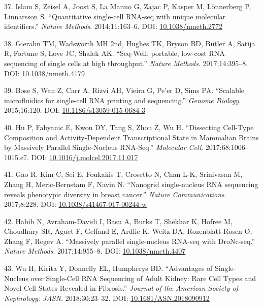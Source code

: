 \documentclass[11pt,a4paper,titlepage,twoside,openright]{style/unimelbthesis}
\theoremstyle{definition}
\theoremstyle{definition}
\theoremstyle{definition}
\theoremstyle{remark}
\begin{document}
\begin{mainmatter}
\leavevmode\hypertarget{ref-Islam2014-gq}{}%
37. Islam S, Zeisel A, Joost S, La Manno G, Zajac P, Kasper M, Lönnerberg P, Linnarsson S. ``Quantitative single-cell RNA-seq with unique molecular identifiers.'' \emph{Nature Methods}. 2014;11:163--6. DOI: \href{https://doi.org/10.1038/nmeth.2772}{10.1038/nmeth.2772}

\leavevmode\hypertarget{ref-Gierahn2017-kr}{}%
38. Gierahn TM, Wadsworth MH 2nd, Hughes TK, Bryson BD, Butler A, Satija R, Fortune S, Love JC, Shalek AK. ``Seq-Well: portable, low-cost RNA sequencing of single cells at high throughput.'' \emph{Nature Methods}. 2017;14:395--8. DOI: \href{https://doi.org/10.1038/nmeth.4179}{10.1038/nmeth.4179}

\leavevmode\hypertarget{ref-Bose2015-vn}{}%
39. Bose S, Wan Z, Carr A, Rizvi AH, Vieira G, Pe'er D, Sims PA. ``Scalable microfluidics for single-cell RNA printing and sequencing.'' \emph{Genome Biology}. 2015;16:120. DOI: \href{https://doi.org/10.1186/s13059-015-0684-3}{10.1186/s13059-015-0684-3}

\leavevmode\hypertarget{ref-Hu2017-jm}{}%
40. Hu P, Fabyanic E, Kwon DY, Tang S, Zhou Z, Wu H. ``Dissecting Cell-Type Composition and Activity-Dependent Transcriptional State in Mammalian Brains by Massively Parallel Single-Nucleus RNA-Seq.'' \emph{Molecular Cell}. 2017;68:1006--1015.e7. DOI: \href{https://doi.org/10.1016/j.molcel.2017.11.017}{10.1016/j.molcel.2017.11.017}

\leavevmode\hypertarget{ref-Gao2017-tq}{}%
41. Gao R, Kim C, Sei E, Foukakis T, Crosetto N, Chan L-K, Srinivasan M, Zhang H, Meric-Bernstam F, Navin N. ``Nanogrid single-nucleus RNA sequencing reveals phenotypic diversity in breast cancer.'' \emph{Nature Communications}. 2017;8:228. DOI: \href{https://doi.org/10.1038/s41467-017-00244-w}{10.1038/s41467-017-00244-w}

\leavevmode\hypertarget{ref-Habib2017-uh}{}%
42. Habib N, Avraham-Davidi I, Basu A, Burks T, Shekhar K, Hofree M, Choudhury SR, Aguet F, Gelfand E, Ardlie K, Weitz DA, Rozenblatt-Rosen O, Zhang F, Regev A. ``Massively parallel single-nucleus RNA-seq with DroNc-seq.'' \emph{Nature Methods}. 2017;14:955--8. DOI: \href{https://doi.org/10.1038/nmeth.4407}{10.1038/nmeth.4407}

\leavevmode\hypertarget{ref-Wu2018-xf}{}%
43. Wu H, Kirita Y, Donnelly EL, Humphreys BD. ``Advantages of Single-Nucleus over Single-Cell RNA Sequencing of Adult Kidney: Rare Cell Types and Novel Cell States Revealed in Fibrosis.'' \emph{Journal of the American Society of Nephrology: JASN}. 2018;30:23--32. DOI: \href{https://doi.org/10.1681/ASN.2018090912}{10.1681/ASN.2018090912}


\end{mainmatter}
\end{document}
